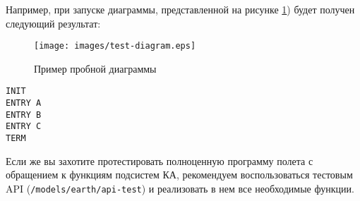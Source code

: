 \documentclass[12pt,a4paper]{article}
\begin{document}
Например, при запуске диаграммы, представленной на рисунке \ref{Pic:TestDiagr}) будет получен следующий результат:

\begin{figure}[tbh]
  \begin{center}
    \texttt{[image: images/test-diagram.eps]}
    \caption{Пример пробной диаграммы}
    \label{Pic:TestDiagr}
  \end{center}
\end{figure}

\begin{verbatim}
INIT
ENTRY A
ENTRY B
ENTRY C
TERM
\end{verbatim}

Если же вы захотите протестировать полноценную программу полета с обращением к функциям
подсистем КА, рекомендуем воспользоваться тестовым API (\verb'/models/earth/api-test') и
реализовать в нем все необходимые функции.
\end{document}
